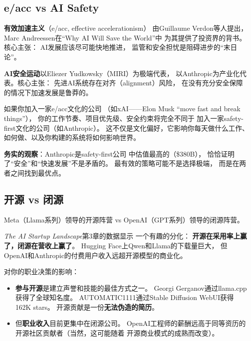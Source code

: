 \subsection{e/acc vs AI Safety}

\textbf{有效加速主义}（e/acc, effective accelerationism）
由Guillaume Verdon等人提出，
Marc Andreessen在``Why AI Will Save the World''中
为其提供了投资界的背书。核心主张：
AI发展应该尽可能快地推进，
监管和安全担忧是阻碍进步的``末日论''。

\textbf{AI安全运动}以Eliezer Yudkowsky（MIRI）为极端代表，
以Anthropic为产业化代表。核心主张：
先进AI系统存在对齐（alignment）风险，
在没有充分安全保障的情况下加速发展是鲁莽的。

\begin{whybox}[这场辩论为什么与你有关]
如果你加入一家e/acc文化的公司
（如xAI——Elon Musk ``move fast and break things''），
你的工作节奏、项目优先级、安全约束将完全不同于
加入一家safety-first文化的公司（如Anthropic）。
这不仅是文化偏好，它影响你每天做什么工作、
如何做、以及你构建的系统将如何影响世界。

\textbf{务实的观察}：Anthropic是safety-first公司
中估值最高的（\$380B），
恰恰证明了``安全''和``快速发展''不是矛盾的。
最有效的策略可能不是选择极端，
而是在两者之间找到最优点。
\end{whybox}

\subsection{开源 vs 闭源}

Meta（Llama系列）领导的开源阵营
vs OpenAI（GPT系列）领导的闭源阵营。

\textit{The AI Startup Landscape}第3章的数据显示
一个有趣的分化：
\textbf{开源在采用率上赢了，闭源在营收上赢了}。
Hugging Face上Qwen和Llama的下载量巨大，
但OpenAI和Anthropic的付费用户收入远超开源模型的商业化。

对你的职业决策的影响：

\begin{itemize}
  \item \textbf{参与开源}是建立声誉和技能的最佳方式之一。
    Georgi Gerganov通过llama.cpp获得了全球知名度。
    AUTOMATIC1111通过Stable Diffusion WebUI获得162K stars。
    开源贡献是一份\textbf{无法伪造的简历}。
  \item 但\textbf{职业收入}目前更集中在闭源公司。
    OpenAI工程师的薪酬远高于同等资历的
    开源社区贡献者（当然，这可能随着
    开源商业模式的成熟而改变）。
\end{itemize}

